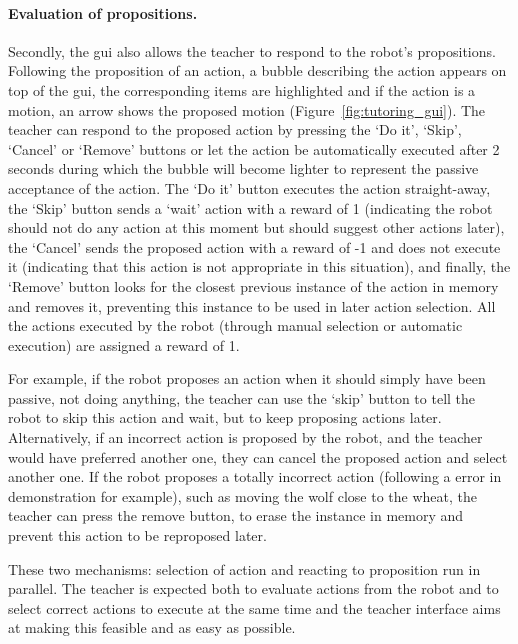 \paragraph{Evaluation of propositions.} Secondly, the \gls{gui} also allows the teacher to respond to the robot's propositions. Following the proposition of an action, a bubble describing the action appears on top of the \gls{gui}, the corresponding items are highlighted and if the action is a motion, an arrow shows the proposed motion (Figure~\ref{fig:tutoring_gui}). The teacher can respond to the proposed action by pressing the `Do it', `Skip', `Cancel' or `Remove' buttons or let the action be automatically executed after 2 seconds during which the bubble will become lighter to represent the passive acceptance of the action. The `Do it' button executes the action straight-away, the `Skip' button sends a `wait' action with a reward of 1 (indicating the robot should not do any action at this moment but should suggest other actions later), the `Cancel' sends the proposed action with a reward of -1 and does not execute it (indicating that this action is not appropriate in this situation), and finally, the `Remove' button looks for the closest previous instance of the action in memory and removes it, preventing this instance to be used in later action selection. %
All the actions executed by the robot (through manual selection or automatic execution) are assigned a reward of 1. 

For example, if the robot proposes an action when it should simply have been passive, not doing anything, the teacher can use the `skip' button to tell the robot to skip this action and wait, but to keep proposing actions later. Alternatively, if an incorrect action is proposed by the robot, and the teacher would have preferred another one, they can cancel the proposed action and select another one. If the robot proposes a totally incorrect action (following a error in demonstration for example), such as moving the wolf close to the wheat, the teacher can press the remove button, to erase the instance in memory and prevent this action to be reproposed later.  

These two mechanisms: selection of action and reacting to proposition run in parallel. The teacher is expected both to evaluate actions from the robot and to select correct actions to execute at the same time and the teacher interface aims at making this feasible and as easy as possible.

